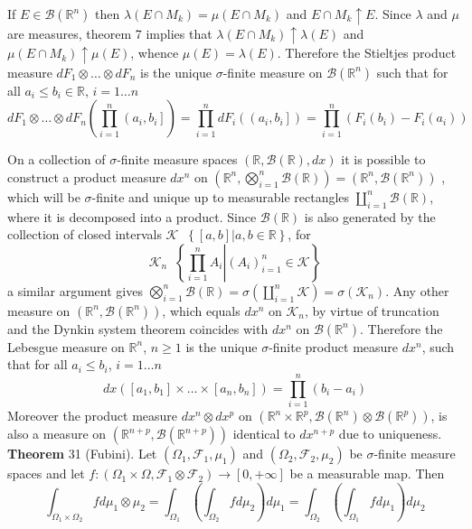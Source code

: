 \documentclass[a4paper]{article}
\newcommand{\obj}[1]{\left\{ #1 \right \}}
\newcommand{\clo}[1]{\left [ #1 \right ]}
\newcommand{\ploc}[1]{\left ( #1 \right ]}
\newcommand{\brac}[1]{\left ( #1 \right )}
\newcommand{\induc}[1]{\left . #1 \right \vert}
\newcommand{\Real}{\mathbb{R}}
\newcommand{\Zinf}{\clo{ 0, +\infty }}
\newcommand{\Fcal}{\mathcal{F}}
\newcommand{\borel}[1]{\mathcal{B}\brac{#1}}
\newcommand{\defn}{\mathop{\overset{\Delta}{=}}\nolimits}
\begin{document}
If $E\in \borel{\Real^n}$ then $\lambda\brac{E\cap M_k} = \mu\brac{E\cap M_k}$ and $E\cap M_k\uparrow E$. Since $\lambda$ and $\mu$ are measures, theorem 7 implies that $\lambda\brac{E\cap M_k}\uparrow\lambda\brac{E}$ and $\mu\brac{E\cap M_k}\uparrow\mu\brac{E}$, whence $\mu\brac{E} = \lambda\brac{E}$. Therefore the Stieltjes product measure $dF_1\otimes\ldots\otimes dF_n$ is the unique $\sigma$-finite measure on $\borel{\Real^n}$ such that for all $a_i\leq b_i\in \Real$, $i=1\ldots n$ \[dF_1\otimes\ldots\otimes dF_n\brac{ \prod_{i=1}^n \ploc{a_i, b_i} } = \prod_{i=1}^n dF_i\brac{\ploc{a_i, b_i}} = \prod_{i=1}^n \brac{F_i\brac{b_i}-F_i\brac{a_i}}\]

On a collection of $\sigma$-finite measure spaces $\brac{\Real, \borel{\Real}, dx}$ it is possible to construct a product measure $dx^n$ on $\brac{\Real^n, \bigotimes_{i=1}^n \borel{\Real} } = \brac{\Real^n, \borel{\Real^n}}$ , which will be $\sigma$-finite and unique up to measurable rectangles $\coprod_{i=1}^n \borel{\Real}$, where it is decomposed into a product. Since $\borel{\Real}$ is also generated by the collection of closed intervals $\mathcal{K} \defn \obj{\induc{\clo{a, b}} a, b \in \Real}$, for \[\mathcal{K}_n \defn \obj{ \induc{\prod_{i=1}^n A_i} \brac{A_i}_{i=1}^n \in \mathcal{K} }\] a similar argument gives $ \bigotimes_{i=1}^n \borel{\Real} = \sigma\brac{\coprod_{i=1}^n \mathcal{K}} = \sigma\brac{\mathcal{K}_n}$. Any other measure on $\brac{\Real^n, \borel{\Real^n}}$, which equals $dx^n$ on $\mathcal{K}_n$, by virtue of truncation and the Dynkin system theorem coincides with $dx^n$ on $\borel{\Real^n}$. Therefore the Lebesgue measure on $\Real^n$, $n\geq 1$ is the unique $\sigma$-finite product measure $dx^n$, such that for all $a_i\leq b_i$, $i=1\ldots n$ \[dx\brac{\clo{a_1, b_1}\times \ldots \times \clo{a_n, b_n}} = \prod_{i=1}^n \brac{b_i-a_i}\] Moreover the product measure $dx^n \otimes dx^p$ on $\brac{\Real^n\times\Real^p, \borel{\Real^n}\otimes \borel{\Real^p}}$, is also a measure on $\brac{\Real^{n+p}, \borel{\Real^{n+p}}}$ identical to $dx^{n+p}$ due to uniqueness.\\

\label{thm:fubini2} \noindent \textbf{Theorem} 31 (Fubini).
Let $\brac{\Omega_1, \Fcal_1, \mu_1}$ and $\brac{\Omega_2, \Fcal_2, \mu_2}$ be $\sigma$-finite measure spaces and let $f:\brac{\Omega_1\times \Omega, \Fcal_1\otimes \Fcal_2}\to\Zinf$ be a measurable map. Then \[\int_{\Omega_1\times\Omega_2} f d\mu_1\otimes\mu_2 = \int_{\Omega_1}\brac{\int_{\Omega_2} f d\mu_2} d\mu_1 = \int_{\Omega_2}\brac{\int_{\Omega_1} f d\mu_1} d\mu_2\]
\end{document}
